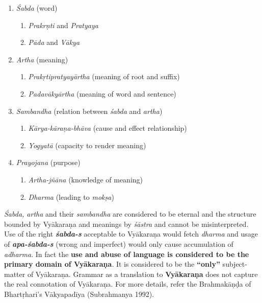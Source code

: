 \begin{enumerate}
\itemsep=0pt
\item \textit{Śabda} (word)
 
\begin{enumerate}
\itemsep=0pt
\item \textit{Prakrṇti} and \textit{Pratyaya}

 \item \textit{Pāda} and \textit{Vākya}
\end{enumerate}

 \item \textit{Artha} (meaning)
 
\begin{enumerate}
\itemsep=0pt
\item \textit{Prakṛtipratyayārtha} (meaning of root and suffix)

 \item \textit{Padavākyārtha} (meaning of word and sentence) 
\end{enumerate}

 \item \textit{Sambandha} (relation between \textit{śabda} and \textit{artha})
 
\begin{enumerate}
\itemsep=0pt
\item \textit{Kārya-kāraṇa-bhāva} (cause and effect relationship)

 \item \textit{Yogyatā} (capacity to render meaning)
\end{enumerate}

 \item \textit{Prayojana} (purpose)
 
\begin{enumerate}
\itemsep=0pt
\item \textit{Artha-jñāna} (knowledge of meaning)

 \item \textit{Dharma} (leading to \textit{mokṣa})
\end{enumerate}

\end{enumerate}

\textit{Śabda, artha} and their \textit{sambandha} are considered to be eternal and the structure bounded by Vyākaraṇa and meanings by \textit{śāstra} and cannot be misinterpreted. Use of the right \textbf{\textit{śabda-s}} acceptable to Vyākaraṇa would fetch \textit{dharma} and usage of \textbf{\textit{apa-śabda-s}} (wrong and imperfect) would only cause accumulation of \textit{adharma}. In fact the \textbf{use and abuse of language is considered to be the primary domain of Vyākaraṇa}. It is considered to be the \textbf{“only”} subject-matter of Vyākaraṇa. Grammar as a translation to \textbf{Vyākaraṇa} does not capture the real connotation of Vyākaraṇa. For more details, refer the Brahmakāṇḍa of Bhartṛhari’s Vākyapadīya (Subrahmanya 1992).

